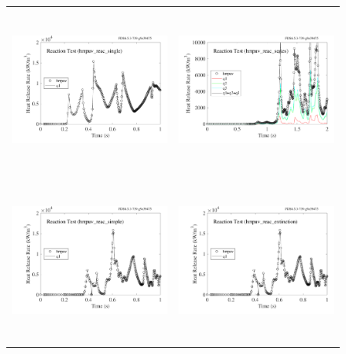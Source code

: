 \documentclass[11pt]{book}
\begin{document}
\begin{figure}[p]
\begin{tabular*}{\textwidth}{lr}
\includegraphics[height=2.15in]{SCRIPT_FIGURES/hrrpuv_reac_single} &
\includegraphics[height=2.15in]{SCRIPT_FIGURES/hrrpuv_reac_series} \\
\includegraphics[height=2.15in]{SCRIPT_FIGURES/hrrpuv_reac_simple} &
\includegraphics[height=2.15in]{SCRIPT_FIGURES/hrrpuv_reac_extinction} \\

\end{tabular*}
\end{figure}
\end{document}
